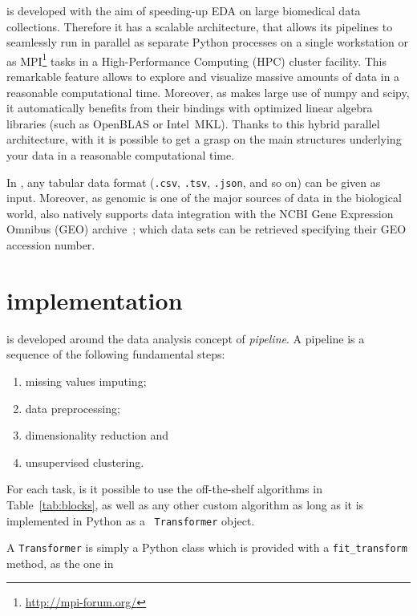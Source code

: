 \ade is developed with the aim of speeding-up EDA on large biomedical data collections.
Therefore it has a scalable architecture, that allows its pipelines to seamlessly run in parallel as separate Python processes on a single workstation or as MPI\footnote{\url{http://mpi-forum.org/}} tasks in a High-Performance Computing (HPC) cluster facility. This remarkable feature allows to explore and visualize massive amounts of data in a reasonable computational time.
Moreover, as \ade makes large use of {\sc numpy} and {\sc scipy}, it automatically benefits from their bindings with optimized linear algebra libraries (such as OpenBLAS or Intel\textsuperscript{\textregistered}~MKL).
Thanks to this hybrid parallel architecture, with \ade it is possible to get a grasp on the main structures underlying your data in a reasonable computational time.

In \ade, any tabular data format ({\tt .csv}, {\tt .tsv}, {\tt .json}, and so on) can be given as input. Moreover, as genomic is one of the major sources of data in the biological world, \ade also natively supports data integration with the NCBI Gene Expression Omnibus (GEO) archive~\cite{barrett2013ncbi}; which data sets can be retrieved specifying their GEO accession number.


\section{\ade implementation} \label{sec:adenine_implementation}
\ade is developed around the data analysis concept of \emph{pipeline}. A pipeline is a sequence of the following fundamental steps:
\begin{enumerate}
  \item missing values imputing;
  \item data preprocessing;
  \item dimensionality reduction and
  \item unsupervised clustering.
\end{enumerate}
For each task, is it possible to use the off-the-shelf algorithms in Table~\ref{tab:blocks}, as well as any other custom algorithm as long as it is implemented in Python as a \sklearn~{\tt Transformer} object.

A {\tt Transformer} is simply a Python class which is provided with a {\tt fit\_transform} method, as the one in 





